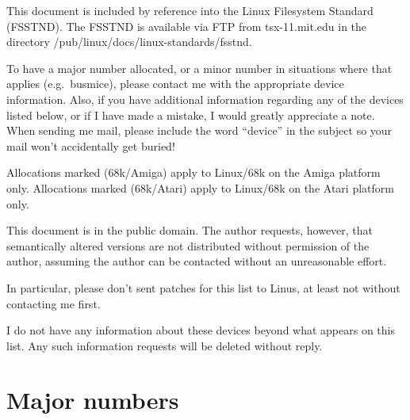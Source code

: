This document is included by reference into the Linux Filesystem
Standard (FSSTND).  The FSSTND is available via FTP from
tsx-11.mit.edu in the directory {\file
/pub/linux/docs/linux-standards/fsstnd}.

To have a major number allocated, or a minor number in situations
where that applies (e.g.\ busmice), please contact me with the
appropriate device information.  Also, if you have additional
information regarding any of the devices listed below, or if I have
made a mistake, I would greatly appreciate a note.  When sending me
mail, please include the word ``device'' in the subject so your mail
won't accidentally get buried!

Allocations marked (68k/Amiga) apply to Linux/68k on the Amiga
platform only.  Allocations marked (68k/Atari) apply to Linux/68k on
the Atari platform only.

This document is in the public domain.  The author requests, however,
that semantically altered versions are not distributed without
permission of the author, assuming the author can be contacted without
an unreasonable effort.

In particular, please don't sent patches for this list to Linus, at
least not without contacting me first.

I do not have any information about these devices beyond what appears
on this list.  Any such information requests will be deleted without
reply.

\section{Major numbers}

